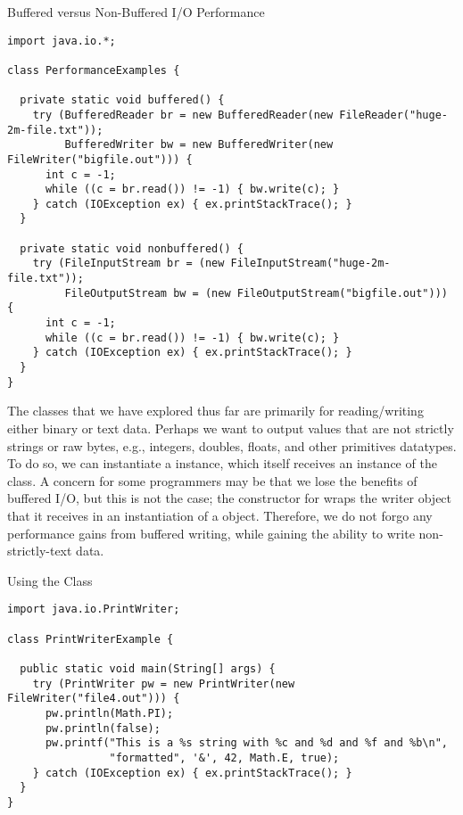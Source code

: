 \begin{cl}{Buffered versus Non-Buffered I/O Performance}
\begin{lstlisting}[language=MyJava]
import java.io.*;

class PerformanceExamples {
  
  private static void buffered() {
    try (BufferedReader br = new BufferedReader(new FileReader("huge-2m-file.txt"));
         BufferedWriter bw = new BufferedWriter(new FileWriter("bigfile.out"))) {
      int c = -1;
      while ((c = br.read()) != -1) { bw.write(c); }
    } catch (IOException ex) { ex.printStackTrace(); }
  }
  
  private static void nonbuffered() {
    try (FileInputStream br = (new FileInputStream("huge-2m-file.txt"));
         FileOutputStream bw = (new FileOutputStream("bigfile.out"))) {
      int c = -1;
      while ((c = br.read()) != -1) { bw.write(c); }
    } catch (IOException ex) { ex.printStackTrace(); }
  }
}
\end{lstlisting}
\end{cl}  

The classes that we have explored thus far are primarily for reading/writing either binary or text data. Perhaps we want to output values that are not strictly strings or raw bytes, e.g., integers, doubles, floats, and other primitives datatypes. To do so, we can instantiate a  instance, which itself receives an instance of the  class. A concern for some programmers may be that we lose the benefits of buffered I/O, but this is not the case; the constructor for  wraps the writer object that it receives in an instantiation of a  object. Therefore, we do not forgo any performance gains from buffered writing, while gaining the ability to write non-strictly-text data.


\begin{cl}{Using the  Class}
\begin{lstlisting}[language=MyJava]
import java.io.PrintWriter;

class PrintWriterExample {
  
  public static void main(String[] args) {
    try (PrintWriter pw = new PrintWriter(new FileWriter("file4.out"))) {
      pw.println(Math.PI);
      pw.println(false);
      pw.printf("This is a %s string with %c and %d and %f and %b\n", 
                "formatted", '&', 42, Math.E, true);
    } catch (IOException ex) { ex.printStackTrace(); }
  }
}
\end{lstlisting}
\end{cl}

